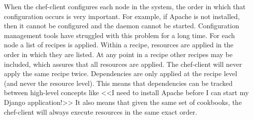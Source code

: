 When the chef-client configures each node in the system, the order in which that configuration occurs is very important. For example, if Apache is not installed, then it cannot be configured and the daemon cannot be started. Configuration management tools have struggled with this problem for a long time. For each node a list of recipes is applied. Within a recipe, resources are applied in the order in which they are listed. At any point in a recipe other recipes may be included, which assures that all resources are applied. The chef-client will never apply the same recipe twice. Dependencies are only applied at the recipe level (and never the resource level). This means that dependencies can be tracked between high-level concepts like <<I need to install Apache before I can start my Django application!>> It also means that given the same set of cookbooks, the chef-client will always execute resources in the same exact order.

